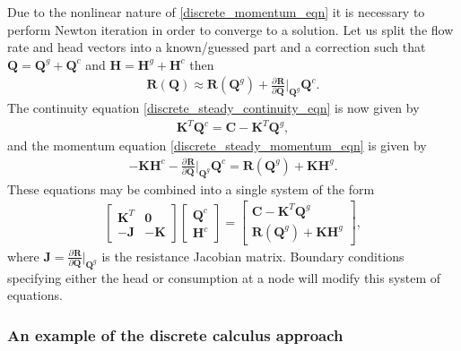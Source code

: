\documentclass[12pt]{article}
\newcommand{\pardiv}[3]{\frac{\partial^{#1} #2}{\partial #3^{#1}}}
\begin{document}
Due to the nonlinear nature of \eqref{discrete_momentum_eqn} it is necessary to perform Newton iteration in order to converge to a solution. Let us split the flow rate and head vectors into a known/guessed part and a correction such that $\mathbf{Q} = \mathbf{Q}^g + \mathbf{Q}^c$ and $\mathbf{H} = \mathbf{H}^g + \mathbf{H}^c$ then 
\begin{align*}
\mathbf{R}(\mathbf{Q}) \approx \mathbf{R}(\mathbf{Q}^g) + \pardiv{}{\mathbf{R}}{\mathbf{Q}} \Bigg\vert_{\mathbf{Q}^g} \mathbf{Q}^c.
\end{align*}
The continuity equation \eqref{discrete_steady_continuity_eqn} is now given by
\begin{align}\label{discrete_steady_continuity_eqn_newton}
\mathbf{K}^T \mathbf{Q}^c = \mathbf{C} - \mathbf{K}^T \mathbf{Q}^g,
\end{align}
and the momentum equation \eqref{discrete_steady_momentum_eqn} is given by
\begin{align}\label{discrete_steady_momentum_eqn_newton}
- \mathbf{K} \mathbf{H}^c - \pardiv{}{\mathbf{R}}{\mathbf{Q}} \Bigg\vert_{\mathbf{Q}^g} \mathbf{Q}^c  = \mathbf{R}(\mathbf{Q}^g) + \mathbf{K} \mathbf{H}^g.
\end{align}
These equations may be combined into a single system of the form
\begin{align}\label{discrete_steady_system}
\begin{bmatrix}
\mathbf{K}^T & \mathbf{0} \\
-\mathbf{J} & -\mathbf{K}
\end{bmatrix} 
\begin{bmatrix}
\mathbf{Q}^c \\ \mathbf{H}^c
\end{bmatrix} = \begin{bmatrix}
\mathbf{C} - \mathbf{K}^T \mathbf{Q}^g \\
\mathbf{R}(\mathbf{Q}^g) + \mathbf{K} \mathbf{H}^g
\end{bmatrix},
\end{align}
where $\mathbf{J} = \pardiv{}{\mathbf{R}}{\mathbf{Q}} \big\vert_{\mathbf{Q}^g}$ is the resistance Jacobian matrix. Boundary conditions specifying either the head or consumption at a node will modify this system of equations. 

\subsubsection{An example of the discrete calculus approach}
\end{document}
